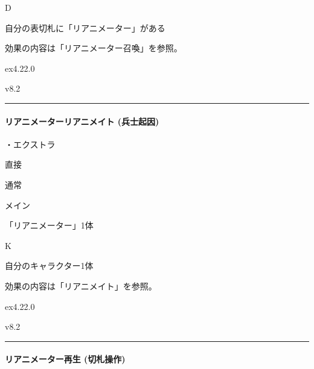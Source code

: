 \documentclass[letterpaper,10pt,dvipdfmx]{sphinxmanual}
\begin{document}
\sphinxAtStartPar
{} D

\sphinxAtStartPar
{}

\sphinxAtStartPar
自分の表切札に「リアニメーター」がある

\sphinxAtStartPar
{}

\sphinxAtStartPar
効果の内容は「リアニメーター召喚」を参照。

\sphinxAtStartPar
{}  ex4.22.0

\sphinxAtStartPar
{}  v8.2


\bigskip\hrule\bigskip



\paragraph{リアニメーターリアニメイト (兵士起因)}
\label{\detokenize{auto/frameActionlist:act-reanimatorreanimate}}\label{\detokenize{auto/frameActionlist:id27}}
\sphinxAtStartPar
{}

\sphinxAtStartPar
・エクストラ

\sphinxAtStartPar
{} 直接

\sphinxAtStartPar
{} 通常

\sphinxAtStartPar
{} メイン

\sphinxAtStartPar
{} 「リアニメーター」1体

\sphinxAtStartPar
{} K

\sphinxAtStartPar
{}

\sphinxAtStartPar
自分のキャラクター1体

\sphinxAtStartPar
{}

\sphinxAtStartPar
効果の内容は「リアニメイト」を参照。

\sphinxAtStartPar
{}  ex4.22.0

\sphinxAtStartPar
{}  v8.2


\bigskip\hrule\bigskip



\paragraph{リアニメーター再生 (切札操作)}
\label{\detokenize{auto/frameActionlist:act-reanimatorrevive}}\label{\detokenize{auto/frameActionlist:id28}}
\sphinxAtStartPar
{}
\end{document}
